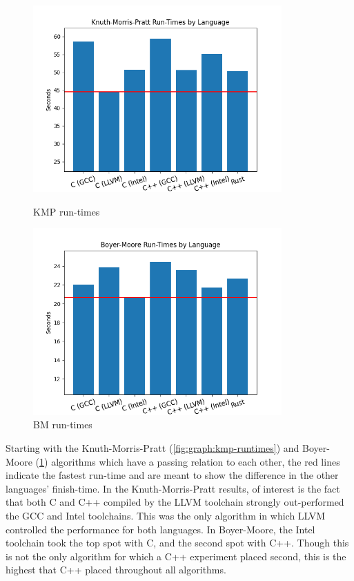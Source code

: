 \begin{figure}[ht]
    \centering
    \begin{minipage}[t]{0.45\textwidth}
        \centering
        \includegraphics[width=0.85\textwidth]{figures/algorithm_runtimes-kmp.png}
        \caption[Knuth-Morris-Pratt run-times]{KMP run-times}
        \label{fig:graph:kmp-runtimes}
    \end{minipage}\hfill
    \begin{minipage}[t]{0.45\textwidth}
        \centering
        \includegraphics[width=0.85\textwidth]{figures/algorithm_runtimes-boyer_moore.png}
        \caption[Boyer-Moore run-times]{BM run-times}
        \label{fig:graph:bm-runtimes}
    \end{minipage}
\end{figure}

Starting with the Knuth-Morris-Pratt (\ref{fig:graph:kmp-runtimes}) and Boyer-Moore (\ref{fig:graph:bm-runtimes}) algorithms which have a passing relation to each other, the red lines indicate the fastest run-time and are meant to show the difference in the other languages' finish-time. In the Knuth-Morris-Pratt results, of interest is the fact that both C and C++ compiled by the LLVM toolchain strongly out-performed the GCC and Intel toolchains. This was the only algorithm in which LLVM controlled the performance for both languages. In Boyer-Moore, the Intel toolchain took the top spot with C, and the second spot with C++. Though this is not the only algorithm for which a C++ experiment placed second, this is the highest that C++ placed throughout all algorithms.

